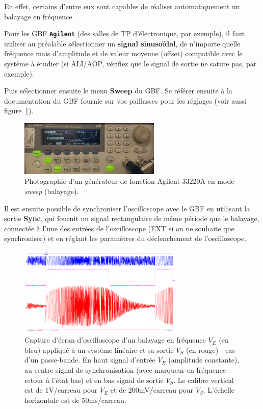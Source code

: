 En effet, certains d'entre eux sont capables de réaliser automatiquement un balayage en fréquence.

Pour les GBF \textbf{\texttt{Agilent}} (des salles de TP d'électronique, par exemple), il faut utiliser au préalable sélectionner un \textbf{signal sinusoïdal}, de n'importe quelle fréquence mais d'amplitude et de valeur moyenne (offset) compatible avec le système à étudier (si ALI/AOP, vérifiez que le signal de sortie ne sature pas, par exemple).

Puis sélectionner ensuite le menu \textbf{Sweep} du GBF. Se référer ensuite à la documentation du GBF fournie sur vos paillasses pour les réglages (voir aussi figure~\ref{fig:gbf_sweep}).

\begin{figure}[h!]
    \centering
	\includegraphics[width=0.6\textwidth]{images/gbf_sweep.jpg}
	
    \caption{Photographie d'un générateur de fonction Agilent 33220A en mode \textit{sweep} (balayage).}
    \label{fig:gbf_sweep}
\end{figure}


Il est ensuite possible de synchroniser l'oscilloscope avec le GBF en utilisant la sortie \textbf{Sync}, qui fournit un signal rectangulaire de même période que le balayage, connectée à l'une des entrées de l'oscilloscope (EXT si on ne souhaite que synchroniser) et en réglant les paramètres du déclenchement de l'oscilloscope.

\begin{figure}[h!]
    \centering
	\includegraphics[width=0.7\textwidth]{images/gbf_sweep_sync.png}
	

	
    \caption{Capture d'écran d'oscilloscope d'un balayage en fréquence $V_E$ (en bleu) appliqué à un système linéaire et sa sortie $V_S$ (en rouge) - cas d'un passe-bande. En haut signal d'entrée $V_E$ (amplitude constante), au centre signal de synchronisation (avec marqueur en fréquence - retour à l'état bas) et en bas signal de sortie $V_S$. Le calibre vertical est de 1V/carreau pour $V_E$ et de 200mV/carreau pour $V_S$. L'échelle horizontale est de 50ms/carreau.}
    \label{fig:rf_sweep}
\end{figure}

